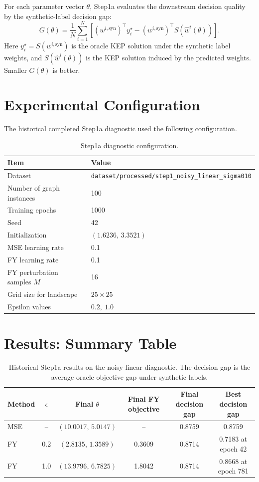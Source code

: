 \documentclass[11pt]{article}
\begin{document}
For each parameter vector \(\theta\), Step1a evaluates the downstream decision
quality by the synthetic-label decision gap:
\[
    G(\theta)
    =
    \frac{1}{N}
    \sum_{i=1}^N
    \left[
        (w^{i,\mathrm{syn}})^\top y_i^\star
        -
        (w^{i,\mathrm{syn}})^\top
        S(\hat w^i(\theta))
    \right].
\]
Here \(y_i^\star = S(w^{i,\mathrm{syn}})\) is the oracle KEP solution under the
synthetic label weights, and \(S(\hat w^i(\theta))\) is the KEP solution induced
by the predicted weights. Smaller \(G(\theta)\) is better.

\section{Experimental Configuration}

The historical completed Step1a diagnostic used the following configuration.

\begin{table}[h]
\centering
\caption{Step1a diagnostic configuration.}
\label{tab:step1a-config}
\begin{tabular}{ll}
\toprule
Item & Value \\
\midrule
Dataset & \texttt{dataset/processed/step1\_noisy\_linear\_sigma010} \\
Number of graph instances & 100 \\
Training epochs & 1000 \\
Seed & 42 \\
Initialization & \((1.6236,\,3.3521)\) \\
MSE learning rate & 0.1 \\
FY learning rate & 0.1 \\
FY perturbation samples \(M\) & 16 \\
Grid size for landscape & \(25\times25\) \\
Epsilon values & \(0.2,\ 1.0\) \\
\bottomrule
\end{tabular}
\end{table}

\section{Results: Summary Table}

\begin{table}[h]
\centering
\caption{Historical Step1a results on the noisy-linear diagnostic. The decision
gap is the average oracle objective gap under synthetic labels.}
\label{tab:step1a-results}
\begin{tabular}{lccccc}
\toprule
Method & \(\epsilon\) & Final \(\theta\) & Final FY objective
& Final decision gap & Best decision gap \\
\midrule
MSE & -- & \((10.0017,\,5.0147)\) & -- & 0.8759 & 0.8759 \\
FY & 0.2 & \((2.8135,\,1.3589)\) & 0.3609 & 0.8714 & 0.7183 at epoch 42 \\
FY & 1.0 & \((13.9796,\,6.7825)\) & 1.8042 & 0.8714 & 0.8668 at epoch 781 \\
\bottomrule
\end{tabular}
\end{table}
\end{document}
